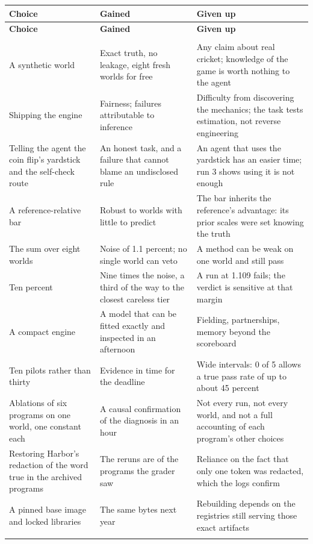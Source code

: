 \documentclass[11pt,letterpaper]{article}
\begin{document}
\begin{small}
\begin{longtable}{>{\raggedright\arraybackslash}p{}>{\raggedright\arraybackslash}p{}>{\raggedright\arraybackslash}p{}}
\toprule
\textbf{Choice} & \textbf{Gained} & \textbf{Given up} \\ \midrule
\endfirsthead
\toprule
\textbf{Choice} & \textbf{Gained} & \textbf{Given up} \\ \midrule
\endhead
\midrule \multicolumn{3}{r}{\footnotesize continued on the next page} \\ \endfoot
\bottomrule \endlastfoot
A synthetic world & Exact truth, no leakage, eight fresh worlds for free & Any claim about real cricket; knowledge of the game is worth nothing to the agent \\ \addlinespace[2pt]
Shipping the engine & Fairness; failures attributable to inference & Difficulty from discovering the mechanics; the task tests estimation, not reverse engineering \\ \addlinespace[2pt]
Telling the agent the coin flip's yardstick and the self-check route & An honest task, and a failure that cannot blame an undisclosed rule & An agent that uses the yardstick has an easier time; run 3 shows using it is not enough \\ \addlinespace[2pt]
A reference-relative bar & Robust to worlds with little to predict & The bar inherits the reference's advantage: its prior scales were set knowing the truth \\ \addlinespace[2pt]
The sum over eight worlds & Noise of 1.1 percent; no single world can veto & A method can be weak on one world and still pass \\ \addlinespace[2pt]
Ten percent & Nine times the noise, a third of the way to the closest careless tier & A run at 1.109 fails; the verdict is sensitive at that margin \\ \addlinespace[2pt]
A compact engine & A model that can be fitted exactly and inspected in an afternoon & Fielding, partnerships, memory beyond the scoreboard \\ \addlinespace[2pt]
Ten pilots rather than thirty & Evidence in time for the deadline & Wide intervals: 0 of 5 allows a true pass rate of up to about 45 percent \\ \addlinespace[2pt]
Ablations of six programs on one world, one constant each & A causal confirmation of the diagnosis in an hour & Not every run, not every world, and not a full accounting of each program's other choices \\ \addlinespace[2pt]
Restoring Harbor's redaction of the word true in the archived programs & The reruns are of the programs the grader saw & Reliance on the fact that only one token was redacted, which the logs confirm \\ \addlinespace[2pt]
A pinned base image and locked libraries & The same bytes next year & Rebuilding depends on the registries still serving those exact artifacts \\ \addlinespace[2pt]
\end{longtable}
\end{small}
\end{document}
